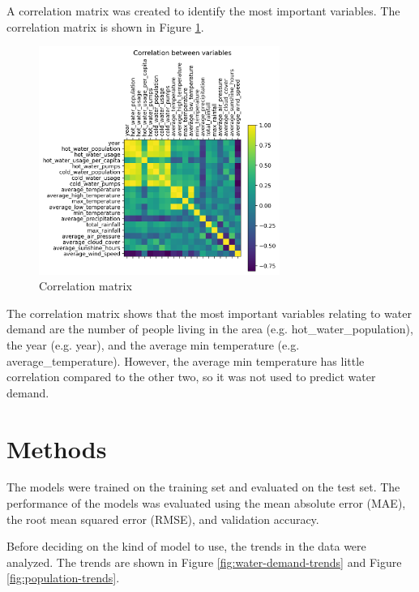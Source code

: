 \documentclass{article}
\begin{document}
A correlation matrix was created to identify the most important variables. The correlation matrix is shown in Figure \ref{fig:correlation-matrix}.

\begin{figure}[!hb]
    \centering
    \includegraphics[width=0.7\textwidth]{../figures/correlation.png}
    \caption{Correlation matrix}
    \label{fig:correlation-matrix}
\end{figure}

The correlation matrix shows that the most important variables relating to water demand are the number of people living in the area (e.g. hot\_water\_population), the year (e.g. year), and the average min temperature (e.g. average\_temperature). However, the average min temperature has little correlation compared to the other two, so it was not used to predict water demand.

\section{Methods}
The models were trained on the training set and evaluated on the test set. The performance of the models was evaluated using the mean absolute error (MAE), the root mean squared error (RMSE), and validation accuracy.

Before deciding on the kind of model to use, the trends in the data were analyzed. The trends are shown in Figure \ref{fig:water-demand-trends} and Figure \ref{fig:population-trends}.
\end{document}
